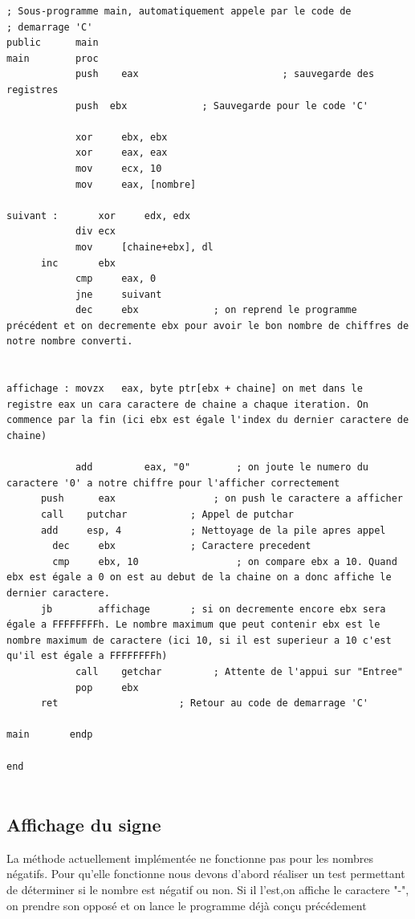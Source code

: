 \documentclass[11pt]{report}
\begin{document}
\begin{lstlisting}
; Sous-programme main, automatiquement appele par le code de
; demarrage 'C'
public      main
main        proc
			push 	eax							; sauvegarde des registres
			push  ebx             ; Sauvegarde pour le code 'C'

			xor		ebx, ebx
			xor		eax, eax
			mov		ecx, 10
			mov		eax, [nombre]

suivant :		xor 	edx, edx
			div	ecx
			mov		[chaine+ebx], dl
      inc		ebx
			cmp		eax, 0
			jne		suivant
			dec		ebx             ; on reprend le programme précédent et on decremente ebx pour avoir le bon nombre de chiffres de notre nombre converti.


affichage : movzx   eax, byte ptr[ebx + chaine] on met dans le registre eax un cara caractere de chaine a chaque iteration. On commence par la fin (ici ebx est égale l'index du dernier caractere de chaine)

			add			eax, "0"        ; on joute le numero du caractere '0' a notre chiffre pour l'afficher correctement
      push   	eax         		; on push le caractere a afficher
      call    putchar     		; Appel de putchar
      add     esp, 4      		; Nettoyage de la pile apres appel
  		dec     ebx             ; Caractere precedent
	    cmp     ebx, 10 				; on compare ebx a 10. Quand ebx est égale a 0 on est au debut de la chaine on a donc affiche le dernier caractere.
      jb     	affichage       ; si on decremente encore ebx sera égale a FFFFFFFFh. Le nombre maximum que peut contenir ebx est le nombre maximum de caractere (ici 10, si il est superieur a 10 c'est qu'il est égale a FFFFFFFFh)
			call    getchar         ; Attente de l'appui sur "Entree"
			pop     ebx
      ret                     ; Retour au code de demarrage 'C'

main       endp

end


\end{lstlisting}


\subsection{Affichage du signe}

La méthode actuellement implémentée ne fonctionne pas pour les nombres négatifs.
Pour qu'elle fonctionne nous devons d'abord réaliser un test permettant de
déterminer si le nombre est négatif ou non.
Si il l'est,on affiche le caractere "-", on prendre son opposé
et on lance le programme déjà conçu précédement
\end{document}
